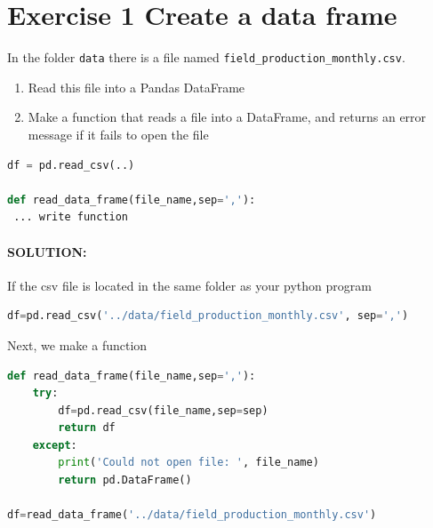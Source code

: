 \documentclass[%
twoside,                 %
final,                   %
10pt]{article}
\begin{document}
\noindent
\section{Exercise 1 Create a data frame}
In the folder \texttt{data} there is a file named \Verb!field_production_monthly.csv!.

\begin{enumerate}
\item Read this file into a Pandas DataFrame

\item Make a function that reads a file into a DataFrame, and returns an error message if it fails to open the file
\end{enumerate}

\noindent





\begin{lstlisting}[language=Python,style=blue1bar]
df = pd.read_csv(..)

def read_data_frame(file_name,sep=','):
 ... write function

\end{lstlisting}


\paragraph{SOLUTION:}

If the csv file is located in the same folder as your python program


\begin{lstlisting}[language=Python,style=blue1bar]
df=pd.read_csv('../data/field_production_monthly.csv', sep=',')

\end{lstlisting}

Next, we make a function











\begin{lstlisting}[language=Python,style=blue1bar]
def read_data_frame(file_name,sep=','):
    try:
        df=pd.read_csv(file_name,sep=sep)
        return df
    except:
        print('Could not open file: ', file_name)
        return pd.DataFrame()

df=read_data_frame('../data/field_production_monthly.csv')

\end{lstlisting}
\end{document}

